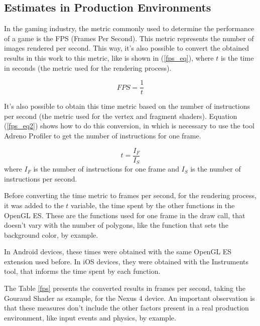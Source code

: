 \documentclass[10pt, conference, compsocconf]{IEEEtran}
\begin{document}
{\subsection{Estimates in Production Environments}

In the gaming industry, the metric commonly used to determine the 
performance of a game is the FPS (Frames Per Second). This metric 
represents the number of images rendered per second. This way,
it's also possible to convert the obtained results in this work 
to this metric, like is shown in (\ref{fps_eq}),
where $t$ is the time in seconds (the metric used for the rendering process).

	\begin{equation}
		FPS = \frac{1} {t}
	\label{fps_eq}
	\end{equation}
	
It's also possible to obtain this time metric based on the number of instructions
per second (the metric used for the vertex and fragment shaders). Equation (\ref{fps_eq2}) shows how to do this conversion, in which is necessary
to use the tool Adreno Profiler to get the number of instructions for one
frame.

	\begin{equation}
		t = \frac{I_F} {I_S}
	\label{fps_eq2}
	\end{equation}
	where $I_{F}$ is the number of instructions for one frame and 
$I_{S}$  is the number of instructions per second.

Before converting the time metric to frames per second, for the rendering process,
it was added to the $t$ variable, the time spent by the other functions
in the OpenGL ES. These are the functions used for one frame in the draw call,
that doesn't vary with the number of polygons, like the function that sets the
background color, by example. 

In Android devices, these times were 
obtained with the same OpenGL ES extension used before. In iOS devices, they
were obtained with the Instruments tool, that informs the time spent by
each function.

The Table \ref{fps} presents the converted results in frames per second, 
taking the Gouraud Shader as example, for the Nexus 4 device. An important
observation is that these measures don't include the other factors present
in a real production environment, like input events and physics, by example.

}
\end{document}
